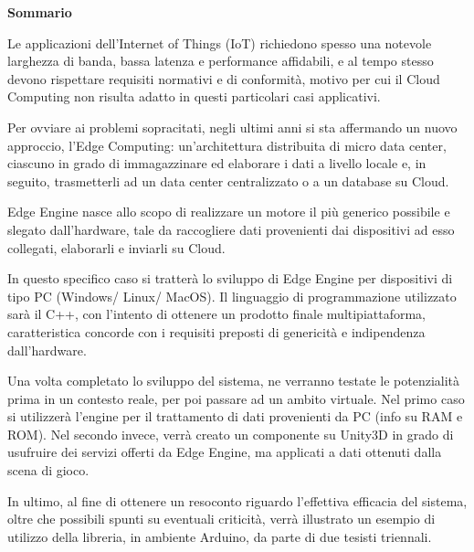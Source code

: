 \clearpage
\renewcommand{\headrulewidth}{0pt}
\begin{center}
	\huge{\textbf{Sommario}}
\end{center}
\null{}

\begin{spacing}{1.25}
	
Le applicazioni dell'Internet of Things (IoT) richiedono spesso una notevole larghezza di banda, bassa latenza e performance affidabili, e al tempo stesso devono rispettare requisiti normativi e di conformità, motivo per cui il Cloud Computing non risulta adatto in questi particolari casi applicativi.

Per ovviare ai problemi sopracitati, negli ultimi anni si sta affermando un nuovo approccio, l'Edge Computing: un’architettura distribuita di micro data center, ciascuno in grado di immagazzinare ed elaborare i dati a livello locale e, in seguito, trasmetterli ad un data center centralizzato o a un database su Cloud.

Edge Engine nasce allo scopo di realizzare un motore il più generico possibile e slegato dall'hardware, tale da raccogliere dati provenienti dai dispositivi ad esso collegati, elaborarli e inviarli su Cloud.

In questo specifico caso si tratterà lo sviluppo di Edge Engine per dispositivi di tipo PC (Windows/ Linux/ MacOS). Il linguaggio di programmazione utilizzato sarà il C++, con l'intento di ottenere un prodotto finale multipiattaforma, caratteristica concorde con i requisiti preposti di genericità e indipendenza dall'hardware.

Una volta completato lo sviluppo del sistema, ne verranno testate le potenzialità prima in un contesto reale, per poi passare ad un ambito virtuale. Nel primo caso si utilizzerà l'engine per il trattamento di dati provenienti da PC (info su RAM e ROM). Nel secondo invece, verrà creato un componente su Unity3D in grado di usufruire dei servizi offerti da Edge Engine, ma applicati a dati ottenuti dalla scena di gioco.

In ultimo, al fine di ottenere un resoconto riguardo l'effettiva efficacia del sistema, oltre che possibili spunti su eventuali criticità, verrà illustrato un esempio di utilizzo della libreria, in ambiente Arduino, da parte di due tesisti triennali.
\end{spacing}
\null{}
\clearpage
\renewcommand{\headrulewidth}{0.5pt}

